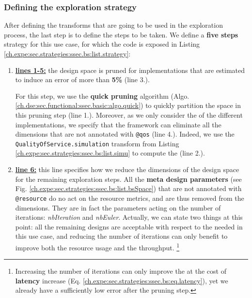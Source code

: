 \clearpage
            \subsubsection{Defining the exploration strategy}
                After defining the transforms that are going to be used in the exploration process, the last step is to define the steps to be taken.
                We define a {\bf five steps} strategy for this use case, for which the code is exposed in Listing \ref{ch.expe:sec.strategies:ssec.bs:list.strategy}:
                \begin{enumerate}
                    \item \underline{\bf lines 1-5:} the design space is pruned for implementations that are estimated to induce an error of more than {\bf 5\%} (line 3.).

                        For this step, we use the {\bf quick pruning} algorithm (Algo. \ref{ch.dse:sec.functional:ssec.basic:algo.quick}) to quickly partition the space in this pruning step (line 1.).
                        Moreover, as we only consider the  of the different implementations, we specify that the framework can eliminate all the dimensions that are not annotated with \lstinline{@qos} (line 4.).
                        Indeed, we use the \lstinline{QualityOfService.simulation} transform from Listing \ref{ch.expe:sec.strategies:ssec.bs:list.simu} to compute the  (line 2.).
                    \item \underline{\bf line 6:} this line specifies how we reduce the dimensions of the design space for the remaining exploration steps.
                        All the {\bf meta design parameters} (see Fig. \ref{ch.expe:sec.strategies:ssec.bs:list.bsSpace}) that are not annotated with \lstinline{@resource} do no act on the resource metrics, and are thus removed from the dimensions. 
                        They are in fact the parameters acting on the number of iterations: {\it nbIteration} and {\it nbEuler}.
                        Actually, we can state two things at this point: all the remaining designs are acceptable with respect to the needed  in this use case, and reducing the number of iterations can only benefit to improve both the resource usage and the throughput.%
                        \footnote{Increasing the number of iterations can only improve the  at the cost of {\bf latency} increase (Eq. \ref{ch.expe:sec.strategies:ssec.bs:eq.latency}), yet we already have a sufficiently low error after the pruning step.}


\end{enumerate}

